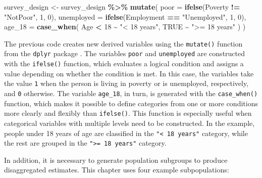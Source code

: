 \documentclass[
  english,
  12pt,
]{book}
\newenvironment{Shaded}{\begin{snugshade}}{\end{snugshade}}
\newcommand{\AttributeTok}[1]{\textcolor[rgb]{0.13,0.29,0.53}{#1}}
\newcommand{\ConstantTok}[1]{\textcolor[rgb]{0.56,0.35,0.01}{#1}}
\newcommand{\DecValTok}[1]{\textcolor[rgb]{0.00,0.00,0.81}{#1}}
\newcommand{\FunctionTok}[1]{\textcolor[rgb]{0.13,0.29,0.53}{\textbf{#1}}}
\newcommand{\NormalTok}[1]{#1}
\newcommand{\OtherTok}[1]{\textcolor[rgb]{0.56,0.35,0.01}{#1}}
\newcommand{\SpecialCharTok}[1]{\textcolor[rgb]{0.81,0.36,0.00}{\textbf{#1}}}
\newcommand{\StringTok}[1]{\textcolor[rgb]{0.31,0.60,0.02}{#1}}
\begin{document}
\begin{Shaded}
\begin{Highlighting}[]
\NormalTok{survey\_design }\OtherTok{\textless{}{-}}\NormalTok{ survey\_design }\SpecialCharTok{\%\textgreater{}\%}
  \FunctionTok{mutate}\NormalTok{(}
    \AttributeTok{poor =} \FunctionTok{ifelse}\NormalTok{(Poverty }\SpecialCharTok{!=} \StringTok{"NotPoor"}\NormalTok{, }\DecValTok{1}\NormalTok{, }\DecValTok{0}\NormalTok{),}
    \AttributeTok{unemployed =} \FunctionTok{ifelse}\NormalTok{(Employment }\SpecialCharTok{==} \StringTok{"Unemployed"}\NormalTok{, }\DecValTok{1}\NormalTok{, }\DecValTok{0}\NormalTok{),}
    \AttributeTok{age\_18 =} \FunctionTok{case\_when}\NormalTok{(}
\NormalTok{      Age }\SpecialCharTok{\textless{}} \DecValTok{18} \SpecialCharTok{\textasciitilde{}} \StringTok{"\textless{} 18 years"}\NormalTok{,}
      \ConstantTok{TRUE} \SpecialCharTok{\textasciitilde{}} \StringTok{"\textgreater{}= 18 years"}
\NormalTok{    )}
\NormalTok{  )}
\end{Highlighting}
\end{Shaded}

The previous code creates new derived variables using the \texttt{mutate()} function from the \texttt{dplyr} package \citep{dplyr2026}. The variables \texttt{poor} and \texttt{unemployed} are constructed with the \texttt{ifelse()} function, which evaluates a logical condition and assigns a value depending on whether the condition is met. In this case, the variables take the value \texttt{1} when the person is living in poverty or is unemployed, respectively, and \texttt{0} otherwise. The variable \texttt{age\_18}, in turn, is generated with the \texttt{case\_when()} function, which makes it possible to define categories from one or more conditions more clearly and flexibly than \texttt{ifelse()}. This function is especially useful when categorical variables with multiple levels need to be constructed. In the example, people under 18 years of age are classified in the \texttt{"\textless{}\ 18\ years"} category, while the rest are grouped in the \texttt{"\textgreater{}=\ 18\ years"} category.

In addition, it is necessary to generate population subgroups to produce disaggregated estimates. This chapter uses four example subpopulations:
\end{document}

